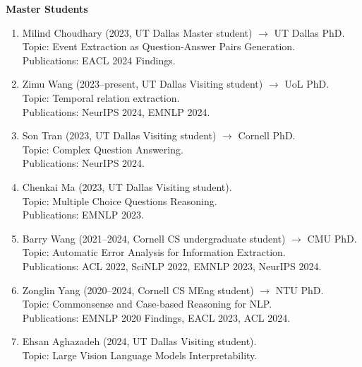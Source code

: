 \noindent \textbf{Master Students}
\begin{enumerate}[label={},leftmargin=15pt]

\item \noindent Milind Choudhary (2023, UT Dallas Master student)  $\rightarrow$ UT Dallas PhD. \\
\indent Topic: Event Extraction as Question-Answer Pairs Generation. \\
\indent Publications: EACL 2024 Findings.

\vspace{1mm}
\item Zimu Wang (2023--present, UT Dallas Visiting student) $\rightarrow$ UoL PhD.\\
Topic: Temporal relation extraction. \\
Publications:  NeurIPS 2024, EMNLP 2024.

\vspace{1mm}
\item Son Tran (2023, UT Dallas Visiting student) $\rightarrow$ Cornell PhD. \\
Topic: Complex Question Answering. \\
Publications: NeurIPS 2024.

\vspace{1mm}
\item Chenkai Ma (2023, UT Dallas Visiting student). \\
Topic: Multiple Choice Questions Reasoning. \\
Publications: EMNLP 2023.

\vspace{1mm}
\item Barry Wang (2021--2024, Cornell CS undergraduate student) $\rightarrow$ CMU PhD. \\
Topic: Automatic Error Analysis for Information Extraction. \\
Publications: ACL 2022, SciNLP 2022, EMNLP 2023, NeurIPS 2024.


\vspace{1mm}
\item Zonglin Yang (2020--2024, Cornell CS MEng student) $\rightarrow$ NTU PhD. \\
Topic: Commonsense and Case-based Reasoning for NLP. \\
Publications: EMNLP 2020 Findings, EACL 2023, ACL 2024.


\vspace{1mm}
\item Ehsan Aghazadeh (2024, UT Dallas Visiting student). \\
Topic: Large Vision Language Models Interpretability.


\end{enumerate}
